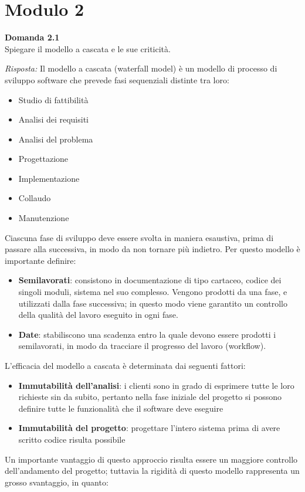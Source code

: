\documentclass{article}
\newenvironment{problem}[2][Domanda]
    { \begin{mdframed}[backgroundcolor=gray!20] \textbf{#1 #2} \\}
    {  \end{mdframed}}
\newenvironment{solution}
    {\textit{Risposta:}}
    {}
\begin{document}
\section{Modulo 2}
\begin{problem}{2.1}
Spiegare il modello a cascata e le sue criticità.
\end{problem}
\begin{solution}
Il modello a cascata (waterfall model) è un modello di processo di sviluppo software che prevede fasi sequenziali distinte tra loro:
\begin{itemize}
	\item Studio di fattibilità
	\item Analisi dei requisiti
	\item Analisi del problema
	\item Progettazione
	\item Implementazione
	\item Collaudo
	\item Manutenzione
\end{itemize}
Ciascuna fase di sviluppo deve essere svolta in maniera esaustiva, prima di passare alla successiva, in modo da non tornare più indietro.
Per questo modello è importante definire:
\begin{itemize}
	\item \textbf{Semilavorati}: consistono in documentazione di tipo cartaceo, codice dei singoli moduli, sistema nel suo complesso.\newline
	Vengono prodotti da una fase, e utilizzati dalla fase successiva; in questo modo viene garantito un controllo della qualità del lavoro eseguito in ogni fase.
	\item \textbf{Date}: stabiliscono una scadenza entro la quale devono essere prodotti i semilavorati, in modo da tracciare il progresso del lavoro (workflow).
\end{itemize}
L'efficacia del modello a cascata è determinata dai seguenti fattori:
\begin{itemize}
	\item \textbf{Immutabilità dell'analisi}: i clienti sono in grado di esprimere tutte le loro richieste sin da subito, pertanto nella fase iniziale del progetto si possono definire tutte le funzionalità che il software deve eseguire
	\item \textbf{Immutabilità del progetto}: progettare l'intero sistema prima di avere scritto codice risulta possibile
\end{itemize}
Un importante vantaggio di questo approccio risulta essere un maggiore controllo dell'andamento del progetto; tuttavia la rigidità di questo modello rappresenta un grosso svantaggio, in quanto:

\end{solution}
\end{document}
